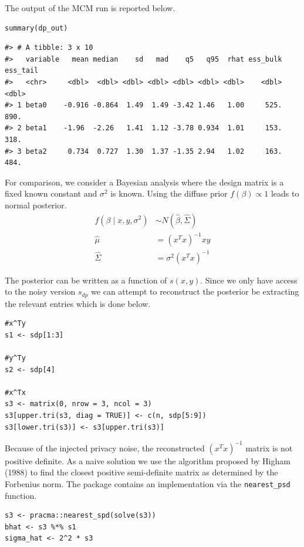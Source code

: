 The output of the MCM run is reported below.

\begin{verbatim}
summary(dp_out)
\end{verbatim}

\begin{verbatim}
#> # A tibble: 3 x 10
#>   variable   mean median    sd   mad    q5   q95  rhat ess_bulk ess_tail
#>   <chr>     <dbl>  <dbl> <dbl> <dbl> <dbl> <dbl> <dbl>    <dbl>    <dbl>
#> 1 beta0    -0.916 -0.864  1.49  1.49 -3.42 1.46   1.00     525.     890.
#> 2 beta1    -1.96  -2.26   1.41  1.12 -3.78 0.934  1.01     153.     318.
#> 3 beta2     0.734  0.727  1.30  1.37 -1.35 2.94   1.02     163.     484.
\end{verbatim}

For comparison, we consider a Bayesian analysis where the design matrix
is a fixed known constant and \(\sigma^2\) is known. Using the
diffuse prior \(f(\beta) \propto 1\) leads to normal posterior.
\[
\begin{aligned}
f(\beta \mid x,y, \sigma^2) &\sim N(\hat{\beta}, \hat{\Sigma})\\
\hat{\mu} &= (x^Tx)^{-1}xy\\
\hat{\Sigma} &= \sigma^{2}(x^Tx)^{-1}
\end{aligned}
\]

The posterior can be written as a function of \(s(x,y)\). Since
we only have access to the noisy version \(s_{dp}\) we can
attempt to reconstruct the posterior be extracting the
relevant entries which is done below.

\begin{verbatim}
#x^Ty
s1 <- sdp[1:3]

#y^Ty
s2 <- sdp[4]

#x^Tx
s3 <- matrix(0, nrow = 3, ncol = 3)
s3[upper.tri(s3, diag = TRUE)] <- c(n, sdp[5:9])
s3[lower.tri(s3)] <- s3[upper.tri(s3)]
\end{verbatim}

Because of the injected privacy noise, the reconstructed
\((x^Tx)^{-1}\) matrix is not positive definite. As a naive solution we use the algorithm proposed by Higham (1988) to find the closest positive semi-definite matrix
as determined by the Forbenius norm. The 
package contains an implementation via the \texttt{nearest\_psd}
function.

\begin{verbatim}
s3 <- pracma::nearest_spd(solve(s3))
bhat <- s3 %*% s1
sigma_hat <- 2^2 * s3
\end{verbatim}

